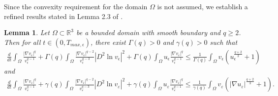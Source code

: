 \documentclass[12pt]{article}
\theoremstyle{plain}
\newtheorem{lemma}{Lemma}[section]
\theoremstyle{definition}
\numberwithin{equation}{section}
\begin{document}
Since  the convexity requirement for the domain $\Omega$ is not assumed, we establish a refined results stated in Lemma 2.3 of \cite{WJDE}.
\begin{lemma}\label{lemma2.7}
Let $\Omega \subset \mathbb R^3$ be a bounded domain with smooth boundary and $q\geq 2$. Then for all $t\in (0,T_{max,\epsilon})$, there exist
$\Gamma(q)>0$ and $\gamma(q)>0$ such that
\begin{align}\label{2.29}
    \frac{d}{dt}\int_{\Omega}\frac{|\nabla v_{\epsilon}|^q}{v_{\epsilon}^{q-1}}+\Gamma(q)\int_{\Omega}\frac{|\nabla
    v_{\epsilon}|^{q-2}}{v_{\epsilon}^{q-3}}|D^2\ln{v_{\epsilon}}|^2+\Gamma(q)\int_{\Omega}u_{\epsilon}\frac{|\nabla
    v_{\epsilon}|^q}{v_{\epsilon}^{q-1}}\leq \frac{1}{\Gamma(q)}\int_{\Omega}v_{\epsilon}(u_{\epsilon}^{\frac{q+2}{2}}+1)
\end{align}
and
\begin{align}\label{2.30}
    \frac{d}{dt}\int_{\Omega}\frac{|\nabla v_{\varepsilon}|^q}{v_{\varepsilon}^{q-1}}+\gamma(q)\int_{\Omega}\frac{|\nabla
    v_{\varepsilon}|^{q-2}}{v_{\varepsilon}^{q-3}}|D^2\ln{v_{\varepsilon}}|^2+\gamma(q)\int_{\Omega}u_{\varepsilon}\frac{|\nabla
    v_{\varepsilon}|^q}{v_{\varepsilon}^{q-1}}\leq \frac{1}{\gamma(q)}\int_{\Omega}v_{\varepsilon}(|\nabla u_{\varepsilon}|^{\frac{q+2}{3}}+1).
\end{align}
\end{lemma}
\end{document}
